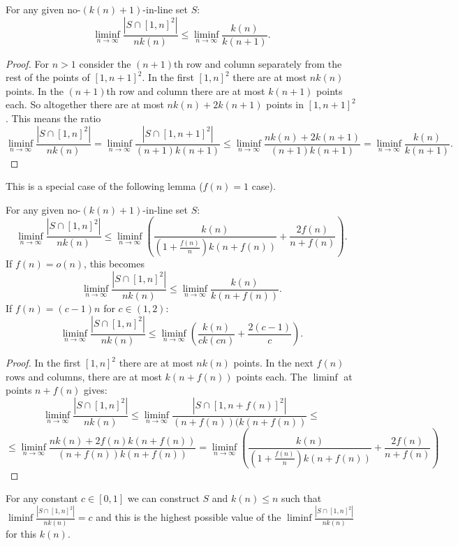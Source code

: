 \documentclass[11pt,a4paper]{article}
\numberwithin{equation}{section}
\begin{document}
\begin{lemma}\label{upperboundlemma}
For any given no-$(k(n)+1)$-in-line set $S$:
$$\liminf_{n\to\infty} \frac{|S \cap [1,n]^2|}{n k(n)} \leq \liminf_{n\to\infty} \frac{k(n)}{k(n+1)}.$$
\end{lemma}
\begin{proof}
For $n>1$ consider the $(n+1)$th row and column separately from the rest of the points of $[1,n+1]^2$. In the first $[1, n]^2$ there are at most $nk(n)$ points. In the $(n+1)$th row and column there are at most $k(n+1)$ points each. So altogether there are at most $nk(n)+2k(n+1)$ points in $[1,n+1]^2$. This means the ratio
$$\liminf_{n\to\infty} \frac{|S \cap [1,n]^2|}{n k(n)}=\liminf_{n\to\infty} \frac{|S \cap [1,n+1]^2|}{(n+1) k(n+1)} \leq\liminf_{n\to\infty} \frac{nk(n)+2k(n+1)}{(n+1)k(n+1)}=\liminf_{n\to\infty} \frac{k(n)}{k(n+1)}.$$
\end{proof}
This is a special case of the following lemma ($f(n)=1$ case).
\begin{lemma}
For any given no-$(k(n)+1)$-in-line set $S$:
$$\liminf_{n\to\infty} \frac{|S \cap [1,n]^2|}{n k(n)} \leq \liminf_{n\to\infty} \left(\frac{k(n)}{(1+\frac{f(n)}{n})k(n+f(n))}+\frac{2f(n)}{n+f(n)}\right).$$
If $f(n)=o(n)$, this becomes $$\liminf_{n\to\infty} \frac{|S \cap [1,n]^2|}{n k(n)} \leq \liminf_{n\to\infty} \frac{k(n)}{k(n+f(n))}.$$
If $f(n)=(c-1)n$ for $c\in (1, 2)$:
$$\liminf_{n\to\infty} \frac{|S \cap [1,n]^2|}{n k(n)} \leq \liminf_{n\to\infty} \left(\frac{k(n)}{ck(cn)}+\frac{2(c-1)}{c}\right).$$
\end{lemma}
\begin{proof}
    In the first $[1, n]^2$ there are at most $nk(n)$ points. In the next $f(n)$ rows and columns, there are at most $k(n+f(n))$ points each. The $\liminf$ at points $n+f(n)$ gives:
    $$\liminf_{n\to\infty} \frac{|S \cap [1,n]^2|}{n k(n)}
    \leq \liminf_{n\to\infty} \frac{|S \cap [1,n+f(n)]^2|}{(n+f(n))(k(n+f(n))}\le $$ $$\le\liminf_{n\to\infty}{\frac{nk(n)+2f(n)k(n+f(n))}{(n+f(n))k(n+f(n))}}
    = \liminf_{n\to\infty} \left(\frac{k(n)}{(1+\frac{f(n)}{n})k(n+f(n))}+\frac{2f(n)}{n+f(n)}\right)$$
\end{proof}


\begin{theorem}\label{theorem35}
    For any constant $c\in[0,1]$ we can construct $S$ and $k(n)\le n$ such that $\liminf \frac{|S \cap [1,n]^2|}{n k(n)}=c$ and this is the highest possible value of the $\liminf\frac{|S \cap [1,n]^2|}{n k(n)}$ for this $k(n)$.
\end{theorem}
\end{document}
